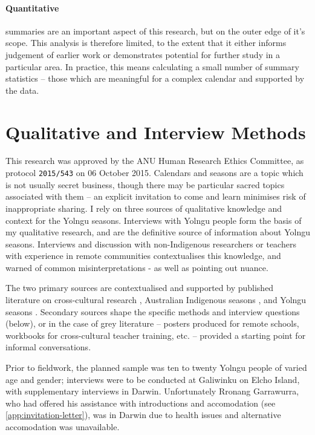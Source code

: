 \paragraph{Quantitative} summaries are an important aspect of this
research, but on the outer edge of it's scope.  This analysis is therefore
limited, to the extent that it either informs judgement of earlier work
or demonstrates potential for further study in a particular area.
%
In practice, this means calculating a small number of summary statistics
-- those which are meaningful for a complex calendar and supported by the
data.



\section{Qualitative and Interview Methods}

This research was approved by the ANU Human Research Ethics Committee,
as protocol \texttt{2015/543} on 06 October 2015.
Calendars and seasons are a topic which is not usually secret business, though
there may be particular sacred topics associated with them -- an explicit
invitation to come and learn minimises risk of inappropriate sharing.
I rely on three sources of qualitative knowledge and context for the Yolngu
seasons.  Interviews with Yolngu people form the basis of my qualitative
research, and are the definitive source of information about Yolngu seasons.
Interviews and discussion with non-Indigenous researchers or teachers with
experience in remote communities contextualises this knowledge, and warned of
common misinterpretations - as well as pointing out nuance.

The two primary sources are contextualised and supported by published
literature on cross-cultural research \citep[eg.][]{smith1999}, Australian
Indigenous seasons \citep[eg.][]{prober2011,oconnor2010}, and Yolngu seasons
\citep{davis1989,atlas2014}.  Secondary sources shape the specific methods
and interview questions (below), or in the case of grey literature --
posters produced for remote schools, workbooks for cross-cultural teacher
training, etc. -- provided a starting point for informal conversations.


Prior to fieldwork, the planned sample was ten to twenty Yolngu people
of varied age and gender; interviews were to be conducted at Galiwinku
on Elcho Island, with supplementary interviews in Darwin.  Unfortunately
Rronang Garrawurra, who had offered his assistance with introductions
and accomodation (see \cref{app:invitation-letter}), was in Darwin due
to health issues and alternative accomodation was unavailable.

